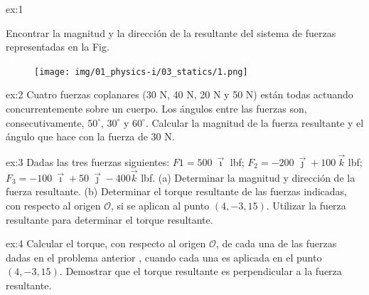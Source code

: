 \begin{multicols}{2}
     \begin{excercise}[][][$(a)\ R =22 \ \mathrm{lbf}, \ \theta=25^\circ$, $(b)\ R =9.43 \ \mathrm{lbf}, \ \theta=72.8^\circ$, $(c)\ R =37 \ \mathrm{lbf}, \ \theta=-38.2^\circ$]{ex:1}{
         Encontrar la magnitud y la dirección de la resultante del sistema de fuerzas representadas en la Fig.
         \begin{figure}[H]
             \centering
             \texttt{[image: img/01\_physics-i/03\_statics/1.png]}
         \end{figure}
         }
     \end{excercise} 
     \begin{excercise}[][][$R = 97.5\ \mathrm{N}$, $\theta=57.8$]{ex:2}{
         Cuatro fuerzas coplanares (30 N, 40 N, 20 N y 50 N) están todas actuando concurrentemente sobre un cuerpo. Los ángulos entre las fuerzas son, consecutivamente, $50^\circ$, $30^\circ$ y $60 ^\circ$. Calcular la magnitud de la fuerza resultante y el ángulo que hace con la fuerza de 30 N.
         }
     \end{excercise} 
     \begin{excercise}[][][$(a) R= 525\ \mathrm{lbf}$, $\vec{e}_R=0.76\vec{\imath}$,  $(b) \tau=7900\ \mathrm{lbf\cdot ft}$]{ex:3}{
         Dadas las tres fuerzas siguientes: $F1 = 500\ \vec{\imath} $ lbf; $F_2 = -200\ \vec{\jmath} +  100\ \vec{k}$ lbf; $F_3 = -100 \ \vec{\imath} + 50\ \vec{\jmath} - 400 \vec{k} $ lbf. (a) Determinar la magnitud y dirección de la fuerza resultante. (b) Determinar el torque resultante de las fuerzas indicadas, con respecto al origen $\mathcal{O}$, si se aplican al punto $(4, -3, 15)$. Utilizar la fuerza resultante para determinar el torque resultante.
         }
     \end{excercise}    
     \begin{excercise}[][][$\vec{\tau} = 3150\vec{\imath}+7200\vec{\jmath}+600\vec{k}\ , \tau=7900\mathrm{lbf\cdot ft}$]{ex:4}{
          Calcular el torque, con respecto al origen $\mathcal{O}$, de cada una de las fuerzas dadas en el problema anterior , cuando cada una es aplicada en el punto $(4, -3, 15)$. Demostrar que el torque resultante es perpendicular a la fuerza resultante.
          }
      \end{excercise} 

\end{multicols}
